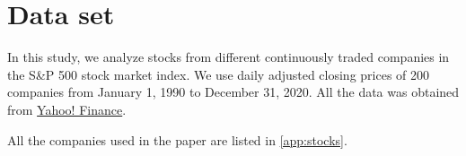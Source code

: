 \section{Data set}\label{sec:data_set}

In this study, we analyze stocks from different continuously traded companies
in the S\&P 500 stock market index. We use daily adjusted closing prices of 200
companies from January 1, 1990 to December 31, 2020. All the data was obtained
from \href{https://finance.yahoo.com/}{Yahoo! Finance}.

All the companies used in the paper are listed in  \ref{app:stocks}.